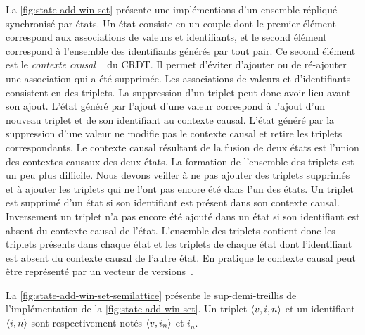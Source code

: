 La \autoref{fig:state-add-win-set} présente une implémentions d'un ensemble répliqué synchronisé par états.
Un état consiste en un couple dont le premier élément correspond aux associations de valeurs et identifiants, et le second élément correspond à l'ensemble des identifiants générés par tout pair.
Ce second élément est le \emph{contexte causal }~\autocite{almeida_2018_delta-crdt-revisited} du \ac{CRDT}.
Il permet d'éviter d'ajouter ou de ré-ajouter une association qui a été supprimée.
Les associations de valeurs et d'identifiants consistent en des triplets.
La suppression d'un triplet peut donc avoir lieu avant son ajout.
L'état généré par l'ajout d'une valeur correspond à l'ajout d'un nouveau triplet et de son identifiant au contexte causal.
L'état généré par la suppression d'une valeur ne modifie pas le contexte causal et retire les triplets correspondants.
Le contexte causal résultant de la fusion de deux états est l'union des contextes causaux des deux états.
La formation de l'ensemble des triplets est un peu plus difficile.
Nous devons veiller à ne pas ajouter des triplets supprimés et à ajouter les triplets qui ne l'ont pas encore été dans l'un des états.
Un triplet est supprimé d'un état si son identifiant est présent dans son contexte causal.
Inversement un triplet n'a pas encore été ajouté dans un état si son identifiant est absent du contexte causal de l'état.
L'ensemble des triplets contient donc les triplets présents dans chaque état et les triplets de chaque état dont l'identifiant est absent du contexte causal de l'autre état.
En pratique le contexte causal peut être représenté par un vecteur de versions~\autocite{parker_1983_versionvector,mattern_1988_timevector}.

La \autoref{fig:state-add-win-set-semilattice} présente le sup-demi-treillis de l'implémentation de la \autoref{fig:state-add-win-set}.
Un triplet $\tuple*{v, i, n}$ et un identifiant $\tuple*{i, n}$ sont respectivement notés $\tuple*{v, i_n}$ et $i_n$.

